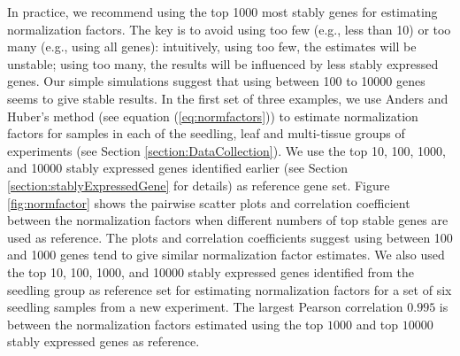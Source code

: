 \documentclass[11pt, a4paper]{article}
\begin{document}
In practice, we recommend using the top 1000 most stably genes for estimating
normalization factors. The key is to avoid using too few (e.g., less than 10)
or too many (e.g., using all genes): intuitively, using too few, the estimates
will be unstable;
using too many, the results will be influenced by less stably
expressed genes.  Our simple simulations suggest that using between 100 to
10000 genes seems to give stable results.  In the first set of three
examples, we use Anders and Huber's method (see equation
(\ref{eq:normfactors})) to estimate normalization factors for samples in each
of the seedling, leaf and multi-tissue groups of experiments (see Section \ref{section:DataCollection}).  We
use the top 10, 100, 1000, and 10000 stably expressed genes identified earlier
(see Section \ref{section:stablyExpressedGene} for details) as reference gene set. Figure \ref{fig:normfactor} shows
the pairwise scatter plots and correlation coefficient between the
normalization factors when different numbers of top stable genes are used as
reference. The plots and correlation coefficients suggest using between 100
and 1000 genes tend to give similar normalization factor estimates. We also
used the top 10, 100, 1000, and 10000 stably expressed genes identified from
the seedling group as reference set for estimating normalization factors for a
set of six seedling samples from a new experiment. The largest Pearson
correlation $0.995$ is between the normalization factors estimated using the
top $1000$ and top $10000$ stably expressed genes as reference.

\end{document}
